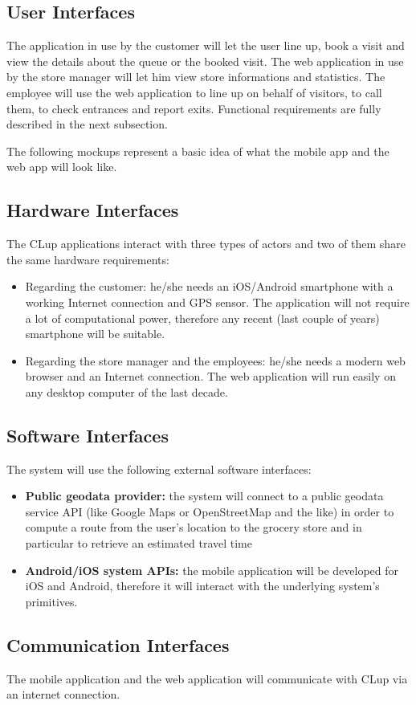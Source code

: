 \subsection{User Interfaces}
The application in use by the customer will let the user line up, book a visit and view the details about the queue or the booked visit.
The web application in use by the store manager will let him view store informations and statistics. The employee will use the web application to line up on behalf of visitors, to call them, to check entrances and report exits. Functional requirements are fully described in the next subsection. 

The following mockups represent a basic idea of what the mobile app and the web app will look like.

\subsection{Hardware Interfaces}
The CLup applications interact with three types of actors and two of them share the same hardware requirements:
\begin{itemize}
    \item Regarding the customer: he/she needs an iOS/Android smartphone with a working Internet connection and GPS sensor. The application will not require a lot of computational power, therefore any recent (last couple of years) smartphone will be suitable.
    \item Regarding the store manager and the employees: he/she needs a modern web browser and an Internet connection. The web application will run easily on any desktop computer of the last decade.
\end{itemize}

\subsection{Software Interfaces}
The system will use the following external software interfaces:
\begin{itemize}
    \item \textbf{Public geodata provider:} the system will connect to a public geodata service API (like Google Maps or OpenStreetMap and the like) in order to compute a route from the user's location to the grocery store and in particular to retrieve an estimated travel time
    \item \textbf{Android/iOS system APIs:} the mobile application will be developed for iOS and Android, therefore it will interact with the underlying system's primitives.
\end{itemize}

\subsection{Communication Interfaces}
The mobile application and the web application will communicate with CLup via an internet connection.